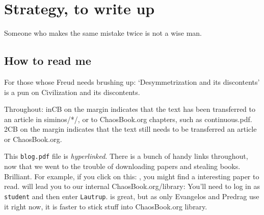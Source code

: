 
\chapter{Strategy, to write up}
\begin{bartlett}{
Someone who makes the same mistake twice is not a wise man.
}
\end{bartlett}




\section{How to read me}

For those whose Freud needs brushing up:
`Desymmetrization and its discontents' is a pun
on 
{Civilization and its discontents}.

Throughout:  {\footnotesize inCB} on the margin                 \inCB
indicates that the text has been transferred to an
article in siminos/*/,  or to ChaosBook.org
chapters, such as
{continuous.pdf}.
 {\footnotesize 2CB} on the margin indicates that the text
still needs to be transferred an article or ChaosBook.org.      \toCB

This \texttt{blog.pdf} file is \emph{hyperlinked}.
There is a bunch of handy links throughout,
now that we went to the trouble of downloading papers and stealing books. Brilliant.
For example, if you click on
this: , you might find a interesting paper to read.
 will
lead you to our internal ChaosBook.org/library:
You'll need to log in as \texttt{student} and then enter \texttt{Lautrup}.
 is great,
but as only Evangelos and Predrag use it right now,
it is faster to stick stuff into ChaosBook.org library.

